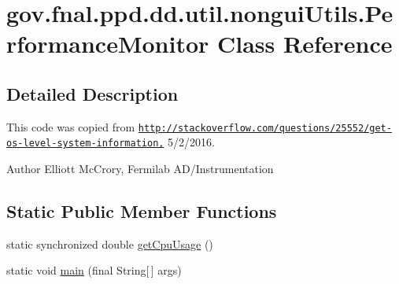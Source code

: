 \hypertarget{classgov_1_1fnal_1_1ppd_1_1dd_1_1util_1_1nonguiUtils_1_1PerformanceMonitor}{\section{gov.\-fnal.\-ppd.\-dd.\-util.\-nongui\-Utils.\-Performance\-Monitor Class Reference}
\label{classgov_1_1fnal_1_1ppd_1_1dd_1_1util_1_1nonguiUtils_1_1PerformanceMonitor}
}


\subsection{Detailed Description}
This code was copied from \href{http://stackoverflow.com/questions/25552/get-os-level-system-information,}{\tt http\-://stackoverflow.\-com/questions/25552/get-\/os-\/level-\/system-\/information,} 5/2/2016.

\begin{DoxyAuthor}{Author}
Elliott Mc\-Crory, Fermilab A\-D/\-Instrumentation 
\end{DoxyAuthor}
\subsection*{Static Public Member Functions}
\begin{DoxyCompactItemize}
\item 
static synchronized double \hyperlink{classgov_1_1fnal_1_1ppd_1_1dd_1_1util_1_1nonguiUtils_1_1PerformanceMonitor_a461715794dca1f1139cf3f332cb95577}{get\-Cpu\-Usage} ()
\item 
static void \hyperlink{classgov_1_1fnal_1_1ppd_1_1dd_1_1util_1_1nonguiUtils_1_1PerformanceMonitor_abdccedb86427a4445b459cbebd4c6424}{main} (final String\mbox{[}$\,$\mbox{]} args)
\end{DoxyCompactItemize}


